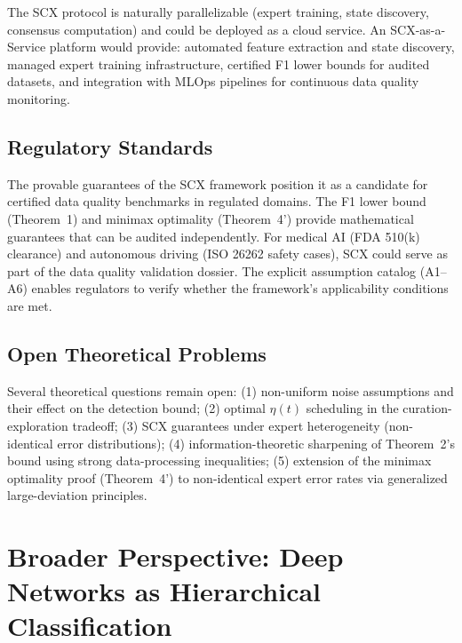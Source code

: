 \documentclass[twocolumn]{article}
\theoremstyle{definition}
\begin{document}
The SCX protocol is naturally parallelizable (expert training, state discovery, consensus computation) and could be deployed as a cloud service. An SCX-as-a-Service platform would provide: automated feature extraction and state discovery, managed expert training infrastructure, certified F1 lower bounds for audited datasets, and integration with MLOps pipelines for continuous data quality monitoring.

\subsection{Regulatory Standards}

The provable guarantees of the SCX framework position it as a candidate for certified data quality benchmarks in regulated domains. The F1 lower bound (Theorem~1) and minimax optimality (Theorem~4') provide mathematical guarantees that can be audited independently. For medical AI (FDA 510(k) clearance) and autonomous driving (ISO 26262 safety cases), SCX could serve as part of the data quality validation dossier. The explicit assumption catalog (A1--A6) enables regulators to verify whether the framework's applicability conditions are met.

\subsection{Open Theoretical Problems}

Several theoretical questions remain open: (1) non-uniform noise assumptions and their effect on the detection bound; (2) optimal $\eta(t)$ scheduling in the curation-exploration tradeoff; (3) SCX guarantees under expert heterogeneity (non-identical error distributions); (4) information-theoretic sharpening of Theorem~2's bound using strong data-processing inequalities; (5) extension of the minimax optimality proof (Theorem~4') to non-identical expert error rates via generalized large-deviation principles.

\section{Broader Perspective: Deep Networks as Hierarchical Classification}
\end{document}
